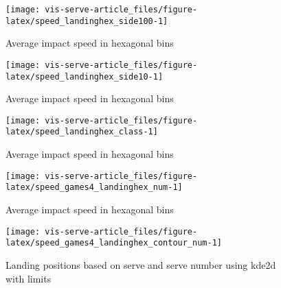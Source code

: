 \documentclass[article]{jss}
\begin{document}
\begin{CodeChunk}
\begin{figure}

{\centering \texttt{[image: vis-serve-article\_files/figure-latex/speed\_landinghex\_side100-1]} 

}

\caption[Average impact speed in hexagonal bins]{Average impact speed in hexagonal bins}\label{fig:speed_landinghex_side100}
\end{figure}
\end{CodeChunk}

\begin{CodeChunk}
\begin{figure}

{\centering \texttt{[image: vis-serve-article\_files/figure-latex/speed\_landinghex\_side10-1]} 

}

\caption[Average impact speed in hexagonal bins]{Average impact speed in hexagonal bins}\label{fig:speed_landinghex_side10}
\end{figure}
\end{CodeChunk}

\begin{CodeChunk}
\begin{figure}

{\centering \texttt{[image: vis-serve-article\_files/figure-latex/speed\_landinghex\_class-1]} 

}

\caption[Average impact speed in hexagonal bins]{Average impact speed in hexagonal bins}\label{fig:speed_landinghex_class}
\end{figure}
\end{CodeChunk}

\begin{CodeChunk}
\begin{figure}

{\centering \texttt{[image: vis-serve-article\_files/figure-latex/speed\_games4\_landinghex\_num-1]} 

}

\caption[Average impact speed in hexagonal bins]{Average impact speed in hexagonal bins}\label{fig:speed_games4_landinghex_num}
\end{figure}
\end{CodeChunk}

\begin{CodeChunk}
\begin{figure}

{\centering \texttt{[image: vis-serve-article\_files/figure-latex/speed\_games4\_landinghex\_contour\_num-1]} 

}

\caption[Landing positions based on serve and serve number using kde2d with limits]{Landing positions based on serve and serve number using kde2d with limits}\label{fig:speed_games4_landinghex_contour_num}
\end{figure}
\end{CodeChunk}
\end{document}
